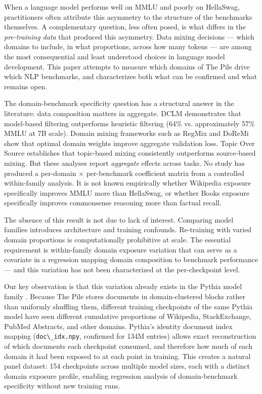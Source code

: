 
When a language model performs well on MMLU and poorly on HellaSwag, practitioners often attribute this asymmetry to the structure of the benchmarks themselves. A complementary question, less often posed, is what differs in the \textit{pre-training data} that produced this asymmetry. Data mixing decisions --- which domains to include, in what proportions, across how many tokens --- are among the most consequential and least understood choices in language model development. This paper attempts to measure which domains of The Pile \citep{Gao2020} drive which NLP benchmarks, and characterizes both what can be confirmed and what remains open.

The domain-benchmark specificity question has a structural answer in the literature: data composition matters in aggregate. DCLM \citep{Li2024} demonstrates that model-based filtering outperforms heuristic filtering (64\% vs. approximately 57\% MMLU at 7B scale). Domain mixing frameworks such as RegMix \citep{Liu2024} and DoReMi \citep{Xie2023} show that optimal domain weights improve aggregate validation loss. Topic Over Source \citep{Peng2025} establishes that topic-based mixing consistently outperforms source-based mixing. But these analyses report \textit{aggregate} effects across tasks. No study has produced a per-domain $\times$ per-benchmark coefficient matrix from a controlled within-family analysis. It is not known empirically whether Wikipedia exposure specifically improves MMLU more than HellaSwag, or whether Books exposure specifically improves commonsense reasoning more than factual recall.

The absence of this result is not due to lack of interest. Comparing model families introduces architecture and training confounds. Re-training with varied domain proportions is computationally prohibitive at scale. The essential requirement is within-family domain exposure variation that can serve as a covariate in a regression mapping domain composition to benchmark performance --- and this variation has not been characterized at the per-checkpoint level.

Our key observation is that this variation already exists in the Pythia model family \citep{Biderman2023}. Because The Pile stores documents in domain-clustered blocks rather than uniformly shuffling them, different training checkpoints of the same Pythia model have seen different cumulative proportions of Wikipedia, StackExchange, PubMed Abstracts, and other domains. Pythia's identity document index mapping (\texttt{doc\textbackslash \_idx.npy}, confirmed for 134M entries) allows exact reconstruction of which documents each checkpoint consumed, and therefore how much of each domain it had been exposed to at each point in training. This creates a natural panel dataset: 154 checkpoints across multiple model sizes, each with a distinct domain exposure profile, enabling regression analysis of domain-benchmark specificity without new training runs.


